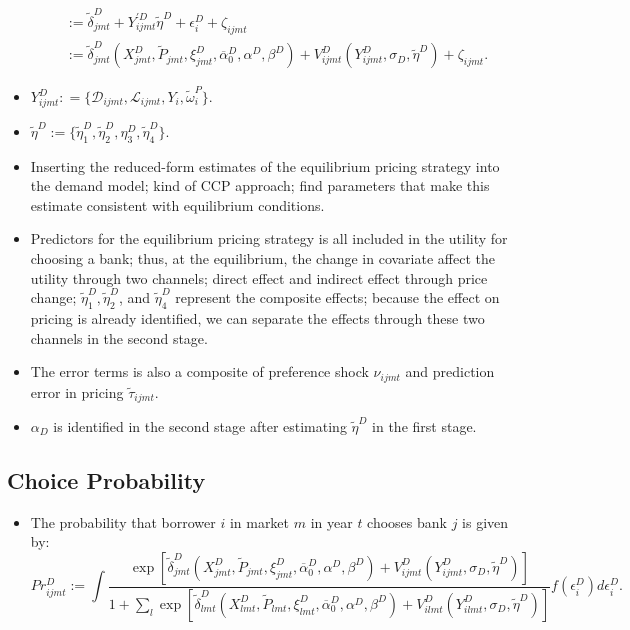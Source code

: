 \documentclass[
]{book}
\providecommand{\tightlist}{%
  \setlength{\itemsep}{0pt}\setlength{\parskip}{0pt}}
\begin{document}
\begin{itemize}
\begin{equation}
\begin{split}
  &:= \tilde{\delta}_{jmt}^D + Y_{ijmt}^{\prime D} \tilde{\eta}^D + \epsilon_i^D + \zeta_{ijmt}\\
  &:= \tilde{\delta}_{jmt}^D(X_{jmt}^D, \widetilde{P}_{jmt}, \xi_{jmt}^D, \overline{\alpha}_0^D, \alpha^D, \beta^D) + V_{ijmt}^D(Y_{ijmt}^D, \sigma_D, \tilde{\eta}^D) + \zeta_{ijmt}.
  \end{split}
  \end{equation}
\item
  \(Y_{ijmt}^D : = \{\mathcal{D}_{ijmt}, \mathcal{L}_{ijmt}, Y_i, \tilde{\omega}_i^P\}\).
\item
  \(\tilde{\eta}^D := \{\tilde{\eta}_1^D, \tilde{\eta}_2^D, \eta_3^D, \tilde{\eta}_4^D\}\).
\item
  Inserting the reduced-form estimates of the equilibrium pricing strategy into the demand model; kind of CCP approach; find parameters that make this estimate consistent with equilibrium conditions.
\item
  Predictors for the equilibrium pricing strategy is all included in the utility for choosing a bank; thus, at the equilibrium, the change in covariate affect the utility through two channels; direct effect and indirect effect through price change; \(\tilde{\eta}_1^D, \tilde{\eta}_2^D\), and \(\tilde{\eta}_4^D\) represent the composite effects; because the effect on pricing is already identified, we can separate the effects through these two channels in the second stage.
\item
  The error terms is also a composite of preference shock \(\nu_{ijmt}\) and prediction error in pricing \(\tilde{\tau}_{ijmt}\).
\item
  \(\alpha_D\) is identified in the second stage after estimating \(\tilde{\eta}^D\) in the first stage.
\end{itemize}

\hypertarget{choice-probability}{%
\subsection{Choice Probability}\label{choice-probability}}

\begin{itemize}
\tightlist
\item
  The probability that borrower \(i\) in market \(m\) in year \(t\) chooses bank \(j\) is given by:
  \[
  Pr_{ijmt}^D := \int \frac{\exp[\tilde{\delta}_{jmt}^D(X_{jmt}^D, \widetilde{P}_{jmt}, \xi_{jmt}^D, \overline{\alpha}_0^D, \alpha^D, \beta^D) + V_{ijmt}^D(Y_{ijmt}^D, \sigma_D, \tilde{\eta}^D)]}{1 + \sum_{l} \exp[\tilde{\delta}_{lmt}^D(X_{lmt}^D, \widetilde{P}_{lmt}, \xi_{lmt}^D, \overline{\alpha}_0^D, \alpha^D, \beta^D) + V_{ilmt}^D(Y_{ilmt}^D, \sigma_D, \tilde{\eta}^D)]} f(\epsilon_i^D) d\epsilon_i^D.
  \]
\end{itemize}
\end{document}
